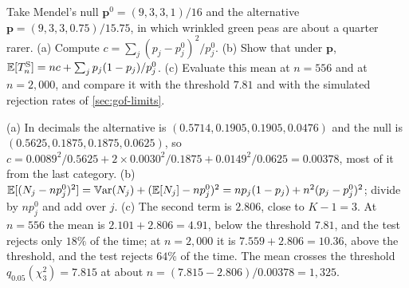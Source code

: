 \begin{exercise}
\label{ex:gof-power}
Take Mendel's null $\mathbf{p}^0 = (9, 3, 3, 1)/16$ and the alternative $\mathbf{p} = (9, 3, 3, 0.75)/15.75$, in which wrinkled green peas are about a quarter rarer. (a) Compute $c = \sum_j(p_j - p^0_j)^2/p^0_j$. (b) Show that under $\mathbf{p}$, $\operatorname*{\mathbb{E}}[T^{\mathrm{S}}_n] = nc + \sum_jp_j(1 - p_j)/p^0_j$. (c) Evaluate this mean at $n = 556$ and at $n = 2{,}000$, and compare it with the threshold $7.81$ and with the simulated rejection rates of \cref{sec:gof-limits}.
\end{exercise}
\begin{solution}
(a) In decimals the alternative is $(0.5714, 0.1905, 0.1905, 0.0476)$ and the null is $(0.5625, 0.1875, 0.1875, 0.0625)$, so $c = 0.0089^2/0.5625 + 2 \times 0.0030^2/0.1875 + 0.0149^2/0.0625 = 0.00378$, most of it from the last category. (b) $\operatorname*{\mathbb{E}}[(N_j - np^0_j)^2] = \operatorname*{\mathbb{V}\text{ar}}(N_j) + (\operatorname*{\mathbb{E}}[N_j] - np^0_j)^2 = np_j(1 - p_j) + n^2(p_j - p^0_j)^2$; divide by $np^0_j$ and add over $j$. (c) The second term is $2.806$, close to $K - 1 = 3$. At $n = 556$ the mean is $2.101 + 2.806 = 4.91$, below the threshold $7.81$, and the test rejects only $18\%$ of the time; at $n = 2{,}000$ it is $7.559 + 2.806 = 10.36$, above the threshold, and the test rejects $64\%$ of the time. The mean crosses the threshold $q_{0.05}(\chi^2_3) = 7.815$ at about $n = (7.815 - 2.806)/0.00378 = 1{,}325$.
\end{solution}
